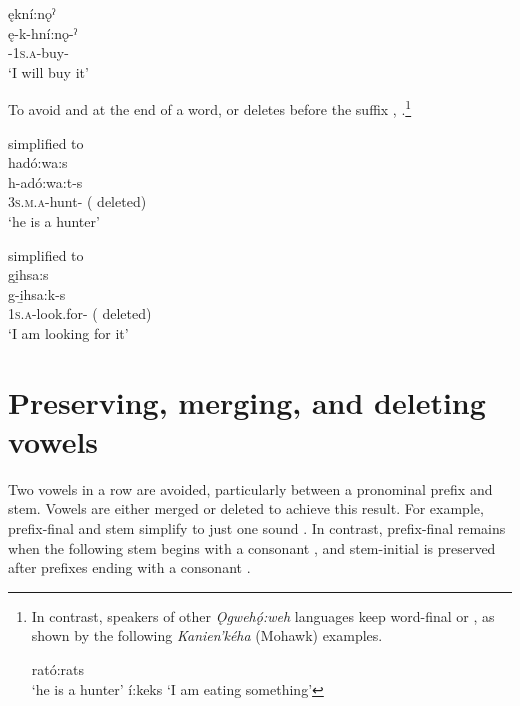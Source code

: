 \ex ękní:nǫˀ\\
\gll ę-k-hní:nǫ-ˀ\\
\fut-\textsc{1s.a}-buy-{\punctual}\\
\glt ‘I will buy it'
\z
\z

To avoid  and  at the end of a word,  or  deletes before the  \textsc{\habitual} suffix , .\footnote{In contrast, speakers of other \textit{Ǫgwehǫ́:weh} languages keep word-final  or , as shown by the following \textit{Kanien’kéha} (Mohawk) examples.

\ea\label{ex:footnoteMohawk}
\ea rató:rats\\
\glt ‘he is a hunter’
\ex í:keks
\glt ‘I am eating something’
\z
\z}

\ea\label{ex:clustersimpex2}  simplified to \\
hadó:wa:s\\\label{ex:clustersimpex2a}
\gll h-adó:wa:t-s\\
 \textsc{3s.m.a}-hunt-{\habitual} ( deleted)\\
\glt `he is a hunter'
\z


\ea\label{ex:clustersimpex}  simplified to \\
gi̱hsa:s\\\label{ex:clustersimpexa}
\gll g-i̱hsa:k-s\\
 \textsc{1s.a}-look.for-{\habitual} ( deleted)\\
\glt `I am looking for it'
\z


\section{Preserving, merging, and deleting vowels} \label{Preserving, merging, and deleting vowels}
Two vowels in a row are avoided, particularly between a pronominal prefix and stem. Vowels are either merged or deleted to achieve this result. For example, prefix-final  and stem  simplify to just one  sound . In contrast, prefix-final  remains when the following stem begins with a consonant , and stem-initial  is preserved after prefixes ending with a consonant . 

